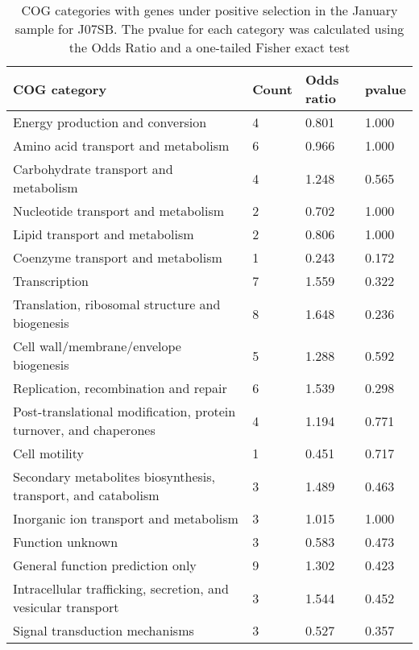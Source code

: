 \begin{table}[]
\footnotesize 
	\tabcolsep=0.11cm 
\caption{COG categories with genes under positive selection in the January sample for J07SB. The pvalue for each category was calculated using the Odds Ratio and a one-tailed Fisher exact test} 
\begin{tabularx}{\textwidth}{L{6cm}R{2cm}R{2cm}R{2cm}} 
\hline 
\textbf{COG category} & \textbf{Count} & \textbf{Odds ratio} & \textbf{pvalue} \\ 
\hline 
Energy production and conversion & 4 & 0.801 & 1.000 \\ 
Amino acid transport and metabolism & 6 & 0.966 & 1.000 \\ 
Carbohydrate transport and metabolism & 4 & 1.248 & 0.565 \\ 
Nucleotide transport and metabolism & 2 & 0.702 & 1.000 \\ 
Lipid transport and metabolism & 2 & 0.806 & 1.000 \\ 
Coenzyme transport and metabolism & 1 & 0.243 & 0.172 \\ 
Transcription & 7 & 1.559 & 0.322 \\ 
Translation, ribosomal structure and biogenesis & 8 & 1.648 & 0.236 \\ 
Cell wall/membrane/envelope biogenesis & 5 & 1.288 & 0.592 \\ 
Replication, recombination and repair & 6 & 1.539 & 0.298 \\ 
Post-translational modification, protein turnover, and chaperones & 4 & 1.194 & 0.771 \\ 
Cell motility & 1 & 0.451 & 0.717 \\ 
Secondary metabolites biosynthesis, transport, and catabolism & 3 & 1.489 & 0.463 \\ 
Inorganic ion transport and metabolism & 3 & 1.015 & 1.000 \\ 
Function unknown & 3 & 0.583 & 0.473 \\ 
General function prediction only & 9 & 1.302 & 0.423 \\ 
Intracellular trafficking, secretion, and vesicular transport & 3 & 1.544 & 0.452 \\ 
Signal transduction mechanisms & 3 & 0.527 & 0.357 \\ 
\end{tabularx} 
\label{January_COG_Selection_J07SB} 
 \end{table} 

